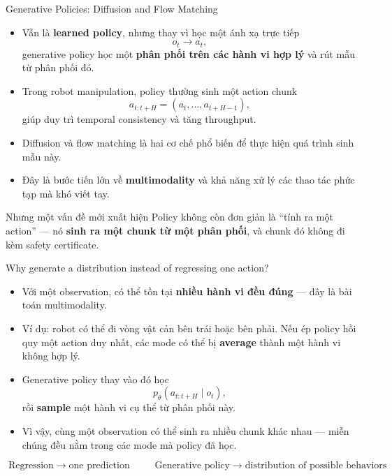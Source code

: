 \documentclass[aspectratio=169]{beamer}
\begin{document}
\begin{frame}[t,shrink=8]{Generative Policies: Diffusion and Flow Matching}

\begin{itemize}
    \item Vẫn là \textbf{learned policy}, nhưng thay vì học một ánh xạ
    trực tiếp
    \[
    o_t \rightarrow a_t,
    \]
    generative policy học một \textbf{phân phối trên các hành vi hợp lý}
    và rút mẫu từ phân phối đó.

    \item Trong robot manipulation, policy thường sinh một
    \alert{action chunk}
    \[
    a_{t:t+H}=(a_t,\ldots,a_{t+H-1}),
    \]
    giúp duy trì temporal consistency và tăng throughput.

    \item Diffusion và flow matching là hai cơ chế phổ biến để thực hiện
    quá trình sinh mẫu này.

    \item Đây là bước tiến lớn về \textbf{multimodality} và khả năng xử lý
    các thao tác phức tạp mà khó viết tay.

\end{itemize}

\begin{alertblock}{Nhưng một vấn đề mới xuất hiện}
Policy không còn đơn giản là ``tính ra một action'' ---
nó \textbf{sinh ra một chunk từ một phân phối}, và chunk đó
không đi kèm safety certificate.
\end{alertblock}
\end{frame}

\begin{frame}[t,shrink=8]{Why generate a distribution instead of regressing one action?}

\begin{itemize}
    \item Với một observation, có thể tồn tại \textbf{nhiều hành vi đều
    đúng} --- đây là bài toán \alert{multimodality}.
    
    \item Ví dụ: robot có thể đi vòng vật cản bên trái hoặc bên phải.
    Nếu ép policy hồi quy một action duy nhất, các mode có thể bị
    \textbf{average} thành một hành vi không hợp lý.

    \item Generative policy thay vào đó học
    \[
    p_\theta(a_{t:t+H}\mid o_t),
    \]
    rồi \textbf{sample} một hành vi cụ thể từ phân phối này.

    \item Vì vậy, cùng một observation có thể sinh ra nhiều chunk khác
    nhau --- miễn chúng đều nằm trong các mode mà policy đã học.

\end{itemize}

\vspace{4pt}
\begin{center}
\[
\boxed{
\text{Regression}
\;\rightarrow\;
\text{one prediction}
}
\qquad
\boxed{
\text{Generative policy}
\;\rightarrow\;
\text{distribution of possible behaviors}
}
\]
\end{center}
\end{frame}
\end{document}
